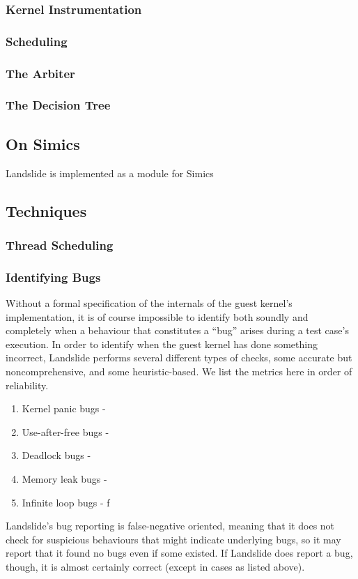 \documentclass[10pt,twocolumn]{article}
\begin{document}
\subsubsection{Kernel Instrumentation}

\subsubsection{Scheduling}

\subsubsection{The Arbiter}

\subsubsection{The Decision Tree}

\subsection{On Simics}

Landslide is implemented as a module for Simics\cite{simics}

\subsection{Techniques}

\subsubsection{Thread Scheduling}

\subsubsection{Identifying Bugs}

Without a formal specification of the internals of the guest kernel's implementation, it is of course impossible to identify both soundly and completely when a behaviour that constitutes a ``bug'' arises during a test case's execution.
In order to identify when the guest kernel has done something incorrect, Landslide performs several different types of checks, some accurate but noncomprehensive, and some heuristic-based.
We list the metrics here in order of reliability.
\begin{enumerate}
	\item Kernel panic bugs - 
	\item Use-after-free bugs - 
	\item Deadlock bugs - 
	\item Memory leak bugs - %
	\item Infinite loop bugs - f
\end{enumerate}
Landslide's bug reporting is false-negative oriented, meaning that it does not check for suspicious behaviours that might indicate underlying bugs, so it may report that it found no bugs even if some existed. If Landslide does report a bug, though, it is almost certainly correct (except in cases as listed above).
\end{document}
